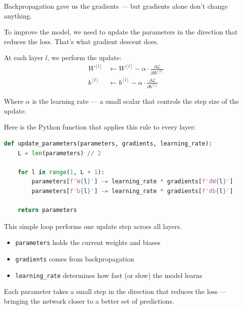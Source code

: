 \documentclass[11pt]{article}
\begin{document}
Backpropagation gave us the gradients — but gradients alone don’t change anything.

To improve the model, we need to update the parameters in the direction that reduces the loss.  
That’s what gradient descent does.

\bigskip

At each layer $l$, we perform the update:
\[
\begin{aligned}
W^{[l]} &\leftarrow W^{[l]} - \alpha \cdot \frac{\partial \mathcal{L}}{\partial W^{[l]}} \\
b^{[l]} &\leftarrow b^{[l]} - \alpha \cdot \frac{\partial \mathcal{L}}{\partial b^{[l]}}
\end{aligned}
\]

\medskip

\noindent Where $\alpha$ is the learning rate — a small scalar that controls the step size of the update.

\bigskip

Here is the Python function that applies this rule to every layer:

\vspace{0.5em}
\begin{lstlisting}[language=Python, frame=single, caption=Parameter update using gradient descent, basicstyle=\ttfamily\small]
def update_parameters(parameters, gradients, learning_rate):
    L = len(parameters) // 2

    for l in range(1, L + 1):
        parameters[f'W{l}'] -= learning_rate * gradients[f'dW{l}']
        parameters[f'b{l}'] -= learning_rate * gradients[f'db{l}']

    return parameters
\end{lstlisting}

\bigskip

This simple loop performs one update step across all layers.

\begin{itemize}
  \item \texttt{parameters} holds the current weights and biases
  \item \texttt{gradients} comes from backpropagation
  \item \texttt{learning\_rate} determines how fast (or slow) the model learns
\end{itemize}

\medskip

\noindent
Each parameter takes a small step in the direction that reduces the loss — bringing the network closer to a better set of predictions.
\end{document}
